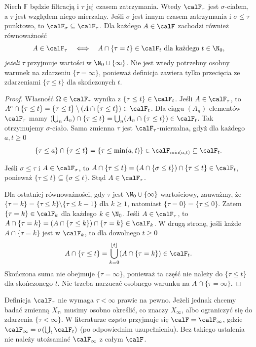 \begin{twierdzenie}
Niech $\mathbb F$ będzie filtracją i $\tau$ jej czasem
zatrzymania. Wtedy $\calF_\tau$ jest $\sigma$-ciałem,
a $\tau$ jest względem niego mierzalny.
Jeśli $\sigma$ jest innym czasem zatrzymania i
$\sigma\le\tau$ punktowo, to
$\calF_\sigma\subseteq\calF_\tau$.
Dla każdego $A\in\calF$ zachodzi również równoważność
\[
A\in\calF_\tau
\quad\Longleftrightarrow\quad
A\cap\{\tau=t\}\in\calF_t
\ \text{dla każdego }t\in\N_0,
\]
\emph{jeżeli} $\tau$ przyjmuje wartości w $\N_0\cup\{\infty\}$.
Nie jest wtedy potrzebny osobny warunek na zdarzeniu
$\{\tau=\infty\}$, ponieważ definicja zawiera tylko
przecięcia ze zdarzeniami $\{\tau\le t\}$ dla skończonych $t$.
\end{twierdzenie}
\begin{proof}
Własność $\Omega\in\calF_\tau$ wynika z
$\{\tau\le t\}\in\calF_t$.
Jeśli $A\in\calF_\tau$, to
$A^c\cap\{\tau\le t\}
=\{\tau\le t\}\setminus(A\cap\{\tau\le t\})\in\calF_t$.
Dla ciągu $(A_n)$ elementów $\calF_\tau$ mamy
$(\bigcup_nA_n)\cap\{\tau\le t\}
=\bigcup_n(A_n\cap\{\tau\le t\})\in\calF_t$.
Tak otrzymujemy $\sigma$-ciało. Sama zmienna $\tau$
jest $\calF_\tau$-mierzalna, gdyż dla każdego $a,t\ge0$
\[
\{\tau\le a\}\cap\{\tau\le t\}
=\{\tau\le\min(a,t)\}\in\calF_{\min(a,t)}\subseteq\calF_t.
\]

Jeśli $\sigma\le\tau$ i $A\in\calF_\sigma$, to
$A\cap\{\tau\le t\}
=(A\cap\{\sigma\le t\})\cap\{\tau\le t\}\in\calF_t$,
ponieważ $\{\tau\le t\}\subseteq\{\sigma\le t\}$.
Stąd $A\in\calF_\tau$.

Dla ostatniej równoważności, gdy $\tau$ jest
$\N_0\cup\{\infty\}$-wartościowy, zauważmy, że
$\{\tau=k\}=\{\tau\le k\}\setminus\{\tau\le k-1\}$
dla $k\ge1$, natomiast $\{\tau=0\}=\{\tau\le0\}$.
Zatem $\{\tau=k\}\in\calF_k$ dla każdego $k\in\N_0$.
Jeśli $A\in\calF_\tau$, to
$A\cap\{\tau=k\}
=(A\cap\{\tau\le k\})\cap\{\tau=k\}\in\calF_k$.
W drugą stronę, jeśli każde $A\cap\{\tau=k\}$
jest w $\calF_k$, to dla dowolnego $t\ge0$
\[
A\cap\{\tau\le t\}
=\bigcup_{k=0}^{\lfloor t\rfloor}
(A\cap\{\tau=k\})\in\calF_t.
\]
Skończona suma nie obejmuje $\{\tau=\infty\}$,
ponieważ ta część nie należy do $\{\tau\le t\}$
dla skończonego $t$. Nie trzeba narzucać osobnego
warunku na $A\cap\{\tau=\infty\}$.
\end{proof}

\begin{uwaga}[Kiedy $\tau=\infty$ z dodatnim prawdopodobieństwem]
Definicja $\calF_\tau$ nie wymaga $\tau<\infty$
prawie na pewno. Jeżeli jednak chcemy badać zmienną
$X_\tau$, musimy osobno określić, co znaczy $X_\infty$,
albo ograniczyć się do zdarzenia $\{\tau<\infty\}$.
W literaturze często przyjmuje się $\calF=\calF_\infty$,
gdzie $\calF_\infty=\sigma(\bigcup_t\calF_t)$
(po odpowiednim uzupełnieniu). Bez takiego ustalenia
nie należy utożsamiać $\calF_\infty$ z całym $\calF$.
\end{uwaga}

